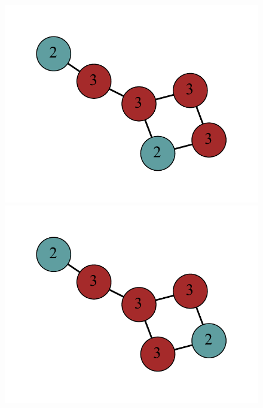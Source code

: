 \documentclass[12pt]{article}
\theoremstyle{plain}
\theoremstyle{definition}
\theoremstyle{remark}
\begin{document}
\begin{figure}[htb]
     	\includegraphics[scale=0.35]{Delta3TriangleFree/001010011011000[3,3,2,2,3,3].pdf}
     	\includegraphics[scale=0.35]{Delta3TriangleFree/001010011011000[3,3,3,2,2,3].pdf}

\end{figure}
\end{document}
